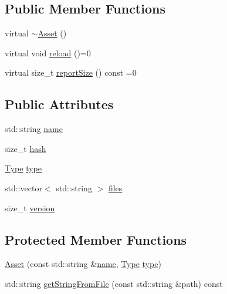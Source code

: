 \subsection*{Public Member Functions}
\begin{DoxyCompactItemize}
\item 
virtual \hyperlink{classassets_1_1Asset_af63a77194b5b67c3fb43d1e19b3f10df}{$\sim$\-Asset} ()
\item 
virtual void \hyperlink{classassets_1_1Asset_a109902837e61161e6f488ad9a47cd377}{reload} ()=0
\item 
virtual size\-\_\-t \hyperlink{classassets_1_1Asset_a43d029b59109ff2952206969d503c25f}{report\-Size} () const =0
\end{DoxyCompactItemize}
\subsection*{Public Attributes}
\begin{DoxyCompactItemize}
\item 
std\-::string \hyperlink{classassets_1_1Asset_a57fe90e1aa9281f2dd59041dffcc74b4}{name}
\item 
size\-\_\-t \hyperlink{classassets_1_1Asset_a875aa61338fbbb28da407e389dd7a559}{hash}
\item 
\hyperlink{classassets_1_1Asset_ac3e27d6385fb4a6a961ec6425501bcf2}{Type} \hyperlink{classassets_1_1Asset_a80a9f5f4cab8e41e4b9cf69f5eb2986a}{type}
\item 
std\-::vector$<$ std\-::string $>$ \hyperlink{classassets_1_1Asset_a54524a00f5e43b916763a4d8bf15b157}{files}
\item 
size\-\_\-t \hyperlink{classassets_1_1Asset_a631640043afcf9327d3cf20a8356a687}{version}
\end{DoxyCompactItemize}
\subsection*{Protected Member Functions}
\begin{DoxyCompactItemize}
\item 
\hyperlink{classassets_1_1Asset_ad454ebaf0bd95df795111efa1b867e17}{Asset} (const std\-::string \&\hyperlink{classassets_1_1Asset_a57fe90e1aa9281f2dd59041dffcc74b4}{name}, \hyperlink{classassets_1_1Asset_ac3e27d6385fb4a6a961ec6425501bcf2}{Type} \hyperlink{classassets_1_1Asset_a80a9f5f4cab8e41e4b9cf69f5eb2986a}{type})
\item 
std\-::string \hyperlink{classassets_1_1Asset_aa6d45f3de78c266c17882630eb9414a9}{get\-String\-From\-File} (const std\-::string \&path) const 
\end{DoxyCompactItemize}


